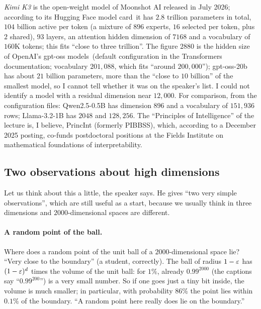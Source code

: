 \begin{beyond}\label{box:L8-models}
\emph{Kimi K3} is the open-weight model of Moonshot AI released in July 2026; according to its Hugging Face model card\,\citep{moonshot2026} it has $2.8$ trillion parameters in total, $104$ billion active per token (a mixture of $896$ experts, $16$ selected per token, plus $2$ shared), $93$ layers, an attention hidden dimension of $7168$ and a vocabulary of $160$K tokens; this fits ``close to three trillion''. The figure $2880$ is the hidden size of OpenAI's gpt-oss models\,\citep{openai2025oss} (default configuration in the Transformers documentation; vocabulary $201{,}088$, which fits ``around $200{,}000$''); gpt-oss-20b has about $21$ billion parameters, more than the ``close to $10$ billion'' of the smallest model, so I cannot tell whether it was on the speaker's list. I could not identify a model with a residual dimension near $12{,}000$. For comparison, from the configuration files: Qwen2.5-0.5B has dimension $896$ and a vocabulary of $151{,}936$ rows; Llama-3.2-1B has $2048$ and $128{,}256$. The ``Principles of Intelligence'' of the lecture is, I believe, PrincInt (formerly PIBBSS), which, according to a December 2025 posting, co-funds postdoctoral positions at the Fields Institute on mathematical foundations of interpretability.
\end{beyond}

\subsection{Two observations about high dimensions}\label{sec:L8-obs}
Let us think about this a little, the speaker says. He gives ``two very simple observations'', which are still useful as a start, because we usually think in three dimensions and $2000$-dimensional spaces are different.

\paragraph{A random point of the ball.}
Where does a random point of the unit ball of a $2000$-dimensional space lie? ``Very close to the boundary'' (a student, correctly). The ball of radius $1-\varepsilon$ has $(1-\varepsilon)^{d}$ times the volume of the unit ball: for $1\%$, already $0.99^{2000}$ (the captions say ``$0.99^{200}$'') is a very small number. So if one goes just a tiny bit inside, the volume is much smaller; in particular, with probability $86\%$ the point lies within $0.1\%$ of the boundary. ``A random point here really does lie on the boundary.''

